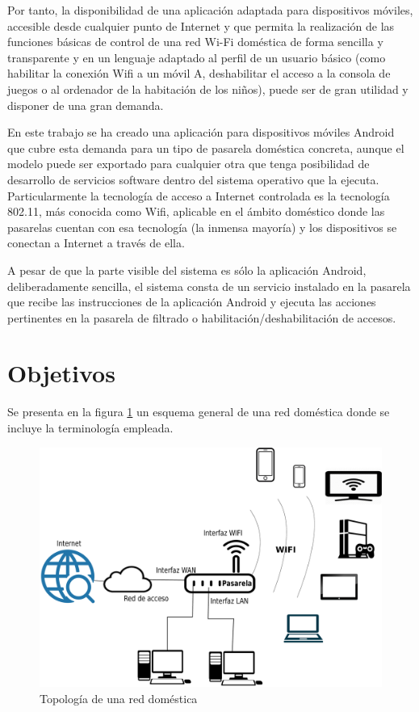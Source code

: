 \documentclass[12pt, twoside]{article}
\begin{document}
Por tanto, la disponibilidad de una aplicación adaptada para dispositivos móviles, accesible desde cualquier punto de Internet y que permita la realización de las funciones básicas de control de una red Wi-Fi doméstica de forma sencilla y transparente y en un lenguaje adaptado al perfil de un usuario básico (como habilitar la conexión Wifi a un móvil A, deshabilitar el acceso a la consola de juegos o al ordenador de la habitación de los niños), puede ser de gran utilidad y disponer de una gran demanda.

En este trabajo se ha creado una aplicación para dispositivos móviles Android que cubre esta demanda para un tipo de pasarela doméstica concreta, aunque el modelo puede ser exportado para cualquier otra que tenga posibilidad de desarrollo de servicios software dentro del sistema operativo que la ejecuta. Particularmente la tecnología de acceso a Internet controlada es la tecnología 802.11, más conocida como Wifi, aplicable en el ámbito doméstico donde las pasarelas cuentan con esa tecnología (la inmensa mayoría) y los dispositivos se conectan a Internet a través de ella.

A pesar de que la parte visible del sistema es sólo la aplicación Android, deliberadamente sencilla, el sistema consta de un servicio instalado en la pasarela que recibe las instrucciones de la aplicación Android y ejecuta las acciones pertinentes en la pasarela de filtrado o habilitación/deshabilitación de accesos.

\cleardoublepage \section{Objetivos} \label{sec:obj}
    Se presenta en la figura \ref{fig:red_soho} un esquema general de una red doméstica donde se incluye la terminología empleada.

    \begin{figure}[h!][hp]
    \centering
        \includegraphics[scale=0.2]{soho_network.eps}
        \caption{Topología de una red doméstica}
        \label{fig:red_soho}
    \end{figure}
\end{document}
